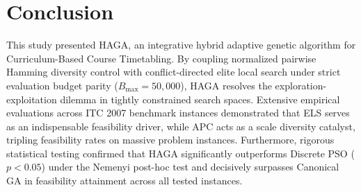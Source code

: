 \documentclass[journal]{IEEEtran}
\begin{document}
\section{Conclusion}
\label{sec:conclusion}
This study presented HAGA, an integrative hybrid adaptive genetic algorithm for Curriculum-Based Course Timetabling. By coupling normalized pairwise Hamming diversity control with conflict-directed elite local search under strict evaluation budget parity ($B_{\max} = 50,000$), HAGA resolves the exploration-exploitation dilemma in tightly constrained search spaces. Extensive empirical evaluations across ITC 2007 benchmark instances demonstrated that ELS serves as an indispensable feasibility driver, while APC acts as a scale diversity catalyst, tripling feasibility rates on massive problem instances. Furthermore, rigorous statistical testing confirmed that HAGA significantly outperforms Discrete PSO ($p < 0.05$) under the Nemenyi post-hoc test and decisively surpasses Canonical GA in feasibility attainment across all tested instances.


\nocite{*}

\end{document}
